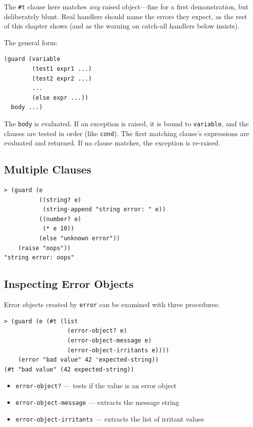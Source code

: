 The \texttt{\#t} clause here matches \emph{any} raised object---fine for a first demonstration, but deliberately blunt. Real handlers should name the errors they expect, as the rest of this chapter shows (and as the warning on catch-all handlers below insists).

The general form:

\begin{lstlisting}
(guard (variable
        (test1 expr1 ...)
        (test2 expr2 ...)
        ...
        (else expr ...))
  body ...)
\end{lstlisting}

The \texttt{body} is evaluated. If an exception is raised, it is bound to \texttt{variable}, and the clauses are tested in order (like \texttt{cond}). The first matching clause's expressions are evaluated and returned. If no clause matches, the exception is re-raised.

\subsection{Multiple Clauses}

\begin{lstlisting}[style=repl]
> (guard (e
          ((string? e)
           (string-append "string error: " e))
          ((number? e)
           (* e 10))
          (else "unknown error"))
    (raise "oops"))
"string error: oops"
\end{lstlisting}

\subsection{Inspecting Error Objects}

Error objects created by \texttt{error} can be examined with three procedures:

\begin{lstlisting}[style=repl]
> (guard (e (#t (list
                  (error-object? e)
                  (error-object-message e)
                  (error-object-irritants e))))
    (error "bad value" 42 'expected-string))
(#t "bad value" (42 expected-string))
\end{lstlisting}

\begin{itemize}
    \item \texttt{error-object?} --- tests if the value is an error object
    \item \texttt{error-object-message} --- extracts the message string
    \item \texttt{error-object-irritants} --- extracts the list of irritant values
\end{itemize}

